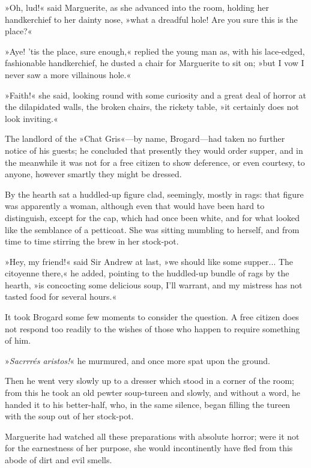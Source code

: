 »Oh, lud!« said Marguerite, as she advanced into the room, holding her handkerchief to her dainty nose, »what a dreadful hole! Are you sure this is the place?«

»Aye! 'tis the place, sure enough,« replied the young man as, with his lace-edged, fashionable handkerchief, he dusted a chair for Marguerite to sit on; »but I vow I never saw a more villainous hole.«

»Faith!« she said, looking round with some curiosity and a great deal of horror at the dilapidated walls, the broken chairs, the rickety table, »it certainly does not look inviting.«

The landlord of the »Chat Gris«\allowbreak---\allowbreak by name, Brogard\allowbreak---\allowbreak had taken no further notice of his guests; he concluded that presently they would order supper, and in the meanwhile it was not for a free citizen to show deference, or even courtesy, to anyone, however smartly they might be dressed.

By the hearth sat a huddled-up figure clad, seemingly, mostly in rags: that figure was apparently a woman, although even that would have been hard to distinguish, except for the cap, which had once been white, and for what looked like the semblance of a petticoat. She was sitting mumbling to herself, and from time to time stirring the brew in her stock-pot.

»Hey, my friend!« said Sir Andrew at last, »we should like some supper... The citoyenne there,« he added, pointing to the huddled-up bundle of rags by the hearth, »is concocting some delicious soup, I'll warrant, and my mistress has not tasted food for several hours.«

It took Brogard some few moments to consider the question. A free citizen does not respond too readily to the wishes of those who happen to require something of him.

»\textit{Sacrrrés aristos!}« he murmured, and once more spat upon the ground.

Then he went very slowly up to a dresser which stood in a corner of the room; from this he took an old pewter soup-tureen and slowly, and without a word, he handed it to his better-half, who, in the same silence, began filling the tureen with the soup out of her stock-pot.

Marguerite had watched all these preparations with absolute horror; were it not for the earnestness of her purpose, she would incontinently have fled from this abode of dirt and evil smells.


